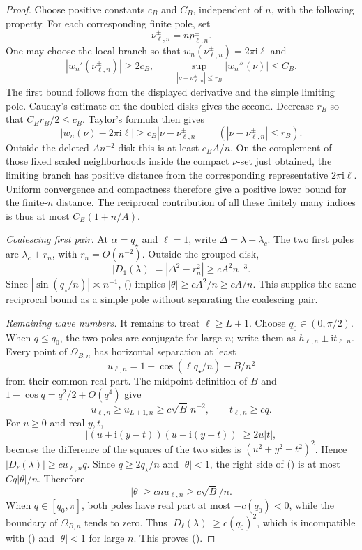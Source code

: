 \documentclass[twoside,10pt]{article}
\numberwithin{equation}{section}
\theoremstyle{slbody}
\theoremstyle{definition}
\theoremstyle{remark}
\renewcommand{\eqref}[1]{%
  \textup{{\normalfont(\oldstylenums{\ref{#1}}}\normalfont)}}
\begin{document}
\begin{proof}
Choose positive constants $c_B$ and $C_B$, independent of $n$, with the
following property.  For each corresponding finite pole, set
\[
 \nu_{\ell,n}^{\pm}=np_{\ell,n}^{\pm}.
\]
One may choose the local branch so that
$w_n(\nu_{\ell,n}^{\pm})=2\pi\mathrm i\ell$ and
\[
 \left|w_n'(\nu_{\ell,n}^{\pm})\right|\ge 2c_B,
 \qquad
 \sup_{|\nu-\nu_{\ell,n}^{\pm}|\le r_B}|w_n''(\nu)|\le C_B.
\]
The first bound follows from the displayed derivative and the simple
limiting pole.  Cauchy's estimate on the doubled disks gives the second.
Decrease $r_B$ so that $C_Br_B/2\le c_B$.  Taylor's formula then gives
\[
 |w_n(\nu)-2\pi\mathrm i\ell|
 \ge c_B|\nu-\nu_{\ell,n}^{\pm}|
 \qquad
 (|\nu-\nu_{\ell,n}^{\pm}|\le r_B).
\]
Outside the deleted $An^{-2}$ disk this is at least $c_BA/n$.  On the
complement of those fixed scaled neighborhoods inside the compact
$\nu$-set just obtained, the limiting branch has positive distance from
the corresponding representative $2\pi\mathrm i\ell$.  Uniform
convergence and compactness therefore give a positive lower bound for
the finite-$n$ distance.  The
reciprocal contribution of all these finitely many indices is thus at
most $C_B(1+n/A)$.

\smallskip
\noindent\emph{Coalescing first pair.}
At $\alpha=q_\star$ and $\ell=1$, write
$\Delta=\lambda-\lambda_c$.  The two first poles are
$\lambda_c\pm r_n$, with $r_n=O(n^{-2})$.  Outside the grouped disk,
\[
 |D_1(\lambda)|=|\Delta^2-r_n^2|
 \ge cA^2n^{-3}.
\]
Since $|\sin(q_\star/n)|\asymp n^{-1}$,
\eqref{eq:critical-cosh-local-bound} implies
$|\theta|\ge cA^2/n\ge cA/n$.  This supplies the same reciprocal
bound as a simple pole without separating the coalescing pair.

\smallskip
\noindent\emph{Remaining wave numbers.}
It remains to treat $\ell\ge L+1$.  Choose
$q_0\in(0,\pi/2)$.  When $q\le q_0$, the two poles are conjugate for
large $n$; write them as
$h_{\ell,n}\pm\mathrm i t_{\ell,n}$.  Every point of
$\Omega_{B,n}$ has horizontal separation at least
\[
 u_{\ell,n}=1-\cos(\ell q_\star/n)-B/n^2
\]
from their common real part.  The midpoint definition of $B$ and
$1-\cos q=q^2/2+O(q^4)$ give
\[
 u_{\ell,n}\ge u_{L+1,n}\ge c\sqrt B\,n^{-2},
 \qquad t_{\ell,n}\ge cq.
\]
For $u\ge0$ and real $y,t$,
\begin{equation}\label{eq:critical-conjugate-product-bound}
 |(u+\mathrm i(y-t))(u+\mathrm i(y+t))|\ge2u|t|,
\end{equation}
because the difference of the squares of the two sides is
$(u^2+y^2-t^2)^2$.  Hence
$|D_\ell(\lambda)|\ge c u_{\ell,n}q$.  Since
$q\ge2q_\star/n$ and $|\theta|<1$, the right side of
\eqref{eq:critical-cosh-local-bound} is at most
$Cq|\theta|/n$.  Therefore
\[
 |\theta|\ge c n u_{\ell,n}\ge c\sqrt B/n.
\]
When $q\in[q_0,\pi]$, both poles have real part at most
$-c(q_0)<0$, while the boundary of $\Omega_{B,n}$ tends to zero.
Thus $|D_\ell(\lambda)|\ge c(q_0)^2$, which is incompatible with
\eqref{eq:critical-cosh-local-bound} and $|\theta|<1$ for large $n$.
This proves \eqref{eq:critical-pole-distance-subcritical}.


\end{proof}
\end{document}
